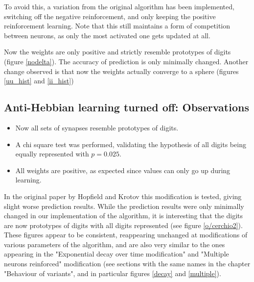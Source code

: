 \documentclass[a4paper]{report}
\begin{document}
To avoid this, a variation from the original algorithm has been implemented, switching off the negative reinforcement, and only keeping the positive reinforcement learning.
Note that this still maintains a form of competition between neurons, as only the most activated one gets updated at all.

Now the weights are only positive and strictly resemble prototypes of digits (figure \ref{nodelta}).
The accuracy of prediction is only minimally changed.
Another change observed is that now the weights actually converge to a sphere (figures \ref{uu_hist} and \ref{ii_hist})

\subsection{Anti-Hebbian learning turned off: Observations}

\begin{itemize}
	\item Now all sets of synapses resemble prototypes of digits.
	\item A chi square test was performed, validating the hypothesis of all digits being equally represented with $p  = 0.025$.
	\item All weights are positive, as expected since values can only go up during learning.
\end{itemize}

In the original paper by Hopfield and Krotov this modification is tested, giving slight worse prediction results.
While the prediction results were only minimally changed in our implementation of the algorithm, it is interesting that the digits are now prototypes of digits with all digits represented (see figure \ref{o/cerchio2}).
These figures appear to be consistent, reappearing unchanged at modifications of various parameters of the algorithm, and are also very similar to the ones appearing in the "Exponential decay over time modification" and "Multiple neurons reinforced" modification (see sections with the same names in the chapter "Behaviour of variants", and in particular figures \ref{decay} and \ref{multiple}).
\end{document}
